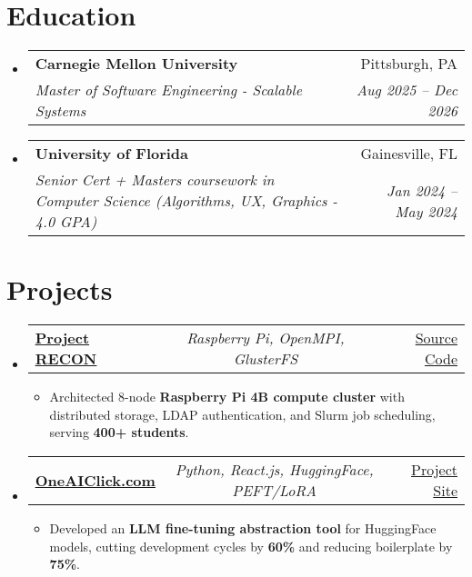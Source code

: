 \documentclass[a4paper,11pt]{article}
\makeatletter
\newcommand{\resumeItem}[1]{
  \item\small{#1}
}
\newcommand{\resumeItemListStart}{\begin{itemize}[rightmargin=0.11in]}
\newcommand{\resumeItemListEnd}{\end{itemize}}
\newcommand{\resumeTrioHeading}[3]{
  \item\small{
    \begin{tabular*}{0.96\textwidth}[t]{
      l@{\extracolsep{\fill}}c@{\extracolsep{\fill}}r
    }
      \textbf{#1} & \textit{#2} & #3
    \end{tabular*}
  }
}
\newcommand{\resumeQuadHeading}[4]{
  \item
  \begin{tabular*}{0.96\textwidth}[t]{l@{\extracolsep{\fill}}r}
    \textbf{#1} & #2 \\
    \textit{\small#3} & \textit{\small #4} \\
  \end{tabular*}
}
\newcommand{\resumeHeadingListStart}{
  \begin{itemize}[leftmargin=0.15in, label={}]
}
\newcommand{\resumeHeadingListEnd}{\end{itemize}}
\makeatother
\begin{document}

\section{Education}
  \resumeHeadingListStart{}
    \resumeQuadHeading{Carnegie Mellon University}{Pittsburgh, PA}
    {Master of Software Engineering - Scalable Systems}{Aug 2025 -- Dec 2026}
    \resumeQuadHeading{University of Florida}{Gainesville, FL}
    {Senior Cert + Masters coursework in Computer Science (Algorithms, UX, Graphics - 4.0 GPA)}{Jan 2024 -- May 2024}
  \resumeHeadingListEnd{}



\section{Projects}
  \resumeHeadingListStart{}
    \resumeTrioHeading{\href{https://github.com/saitrj/project-recon}{\uline{Project RECON}}}{Raspberry Pi, OpenMPI, GlusterFS}{\uline{Source Code}}
      \resumeItemListStart{}
        \resumeItem{Architected 8-node \textbf{Raspberry Pi 4B compute cluster} with distributed storage, LDAP authentication, and Slurm job scheduling, serving \textbf{400+ students}.}
      \resumeItemListEnd{}

    \resumeTrioHeading{\href{https://floaredor.vercel.app/oneaiclick}{\uline{OneAIClick.com}}}{Python, React.js, HuggingFace, PEFT/LoRA}{\uline{Project Site}}
      \resumeItemListStart{}
        \resumeItem{Developed an \textbf{LLM fine-tuning abstraction tool} for HuggingFace models, cutting development cycles by \textbf{60\%} and reducing boilerplate by \textbf{75\%}.}
      \resumeItemListEnd{}
  \resumeHeadingListEnd{}


\end{document}
